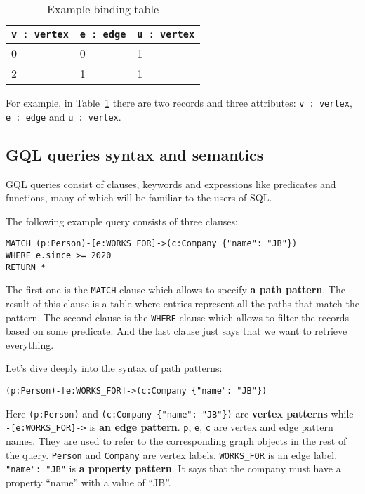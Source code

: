 \documentclass[14pt]{constructor-thesis}
\theoremstyle{definition}
\begin{document}
\begin{table}
  \centering
  
  \begin{tabular}{ |p{3cm}|p{3cm}|p{3cm}|  }
    \hline
    \texttt{v : vertex} & \texttt{e : edge} & \texttt{u : vertex} \\
    \hline
    0 & 0 & 1 \\
    2 & 1 & 1 \\
    \hline
  \end{tabular}

  \caption{Example binding table}
  \label{tab:example-binding-table}
\end{table}

For example, in Table~\ref{tab:example-binding-table} there are two records and three attributes: \texttt{v : vertex}, \texttt{e : edge} and \texttt{u : vertex}. 


\subsection{GQL queries syntax and semantics}
\label{section:intro-GQL}

GQL queries consist of clauses, keywords and expressions like predicates and functions, many of which will be familiar to the users of SQL.


The following example query consists of three clauses:
\begin{verbatim}
MATCH (p:Person)-[e:WORKS_FOR]->(c:Company {"name": "JB"})
WHERE e.since >= 2020
RETURN *
\end{verbatim}

The first one is the \texttt{MATCH}-clause which allows to specify \textbf{a path pattern}. The result of this clause is a table where entries represent all the paths that match the pattern. The second clause is the \texttt{WHERE}-clause which allows to filter the records based on some predicate. And the last clause just says that we want to retrieve everything.

Let's dive deeply into the syntax of path patterns:
\begin{verbatim}
(p:Person)-[e:WORKS_FOR]->(c:Company {"name": "JB"})
\end{verbatim}

Here \verb+(p:Person)+ and \verb+(c:Company {"name": "JB"})+ are \textbf{vertex patterns} while \verb+-[e:WORKS_FOR]->+ is \textbf{an edge pattern}. \texttt{p}, \texttt{e}, \texttt{c} are vertex and edge pattern names. They are used to refer to the corresponding graph objects in the rest of the query. \texttt{Person} and \texttt{Company} are vertex labels. \texttt{WORKS\_FOR} is an edge label. \texttt{"name": "JB"} is \textbf{a property pattern}. It says that the company must have a property ``name'' with a value of ``JB''.
\end{document}
